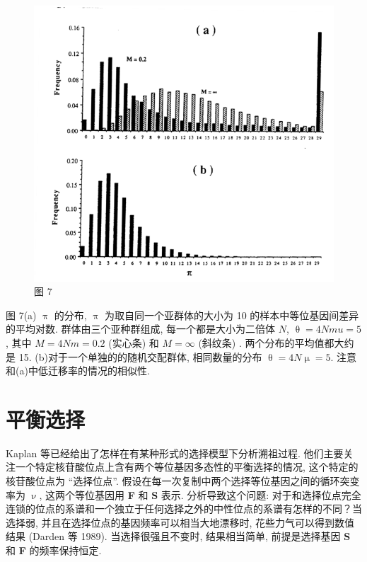 \documentclass[
    12pt,%
    ]{article}
\begin{document}
\begin{figure}
    \centering
    \includegraphics{coalescent-process.images/image7.png}
    \caption{图 7}
\end{figure}

图 7(a) $\uppi$ 的分布, $\uppi$ 为取自同一个亚群体的大小为 10 的样本中等位基因间差异的平均对数. 群体由三个亚种群组成,
每一个都是大小为二倍体 $N$, $\uptheta =4Nmu =5$, 其中 $M=4Nm=0.2$ (实心条) 和 $M=\mathrm{\infty}$ (斜纹条) .
两个分布的平均值都大约是 15. (b)对于一个单独的的随机交配群体, 相同数量的分布 $\uptheta =4N\upmu =5$.
注意和(a)中低迁移率的情况的相似性.

\section{平衡选择}

Kaplan 等已经给出了怎样在有某种形式的选择模型下分析溯祖过程.
他们主要关注一个特定核苷酸位点上含有两个等位基因多态性的平衡选择的情况, 这个特定的核苷酸位点为 ``选择位点''.
假设在每一次复制中两个选择等位基因之间的循环突变率为 $\upnu$, 这两个等位基因用 \textbf{F} 和 \textbf{S} 表示.
分析导致这个问题: 对于和选择位点完全连锁的位点的系谱和一个独立于任何选择之外的中性位点的系谱有怎样的不同？当选择弱,
并且在选择位点的基因频率可以相当大地漂移时, 花些力气可以得到数值结果 (Darden 等 1989). 当选择很强且不变时,
结果相当简单, 前提是选择基因 \textbf{S} 和 \textbf{F} 的频率保持恒定.
\end{document}
